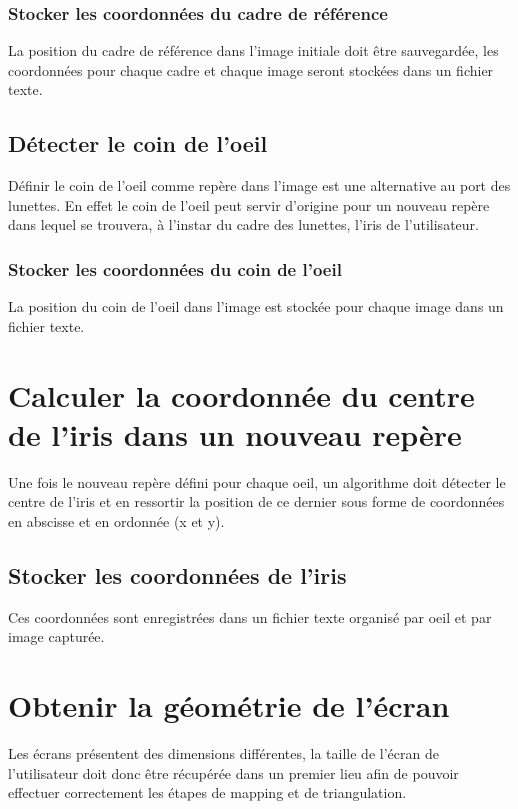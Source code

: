 \documentclass[a4paper, 12pt]{report}
\begin{document}
\subsubsection{Stocker les coordonnées du cadre de référence}
La position du cadre de référence dans l'image initiale doit être sauvegardée, les coordonnées pour chaque cadre et chaque image seront stockées dans un fichier texte.
		\subsection{Détecter le coin de l'oeil}
Définir le coin de l'oeil comme repère dans l'image est une alternative au port des lunettes. En effet le coin de l'oeil peut servir d'origine pour un nouveau repère dans lequel se trouvera, à l'instar du cadre des lunettes, l'iris de l'utilisateur.
\subsubsection{Stocker les coordonnées du coin de l'oeil}
La position du coin de l'oeil dans l'image est stockée pour chaque image dans un fichier texte. 

    \section{Calculer la coordonnée du centre de l'iris dans un nouveau repère}
    Une fois le nouveau repère défini pour chaque oeil, un algorithme doit détecter le centre de l'iris et en ressortir la position de ce dernier sous forme de coordonnées en abscisse et en ordonnée (x et y).
\subsection{Stocker les coordonnées de l'iris}
Ces coordonnées sont enregistrées dans un fichier texte organisé par oeil et par image capturée.
    	\section{Obtenir la géométrie de l'écran}
	Les écrans présentent des dimensions différentes, la taille de l'écran de l'utilisateur doit donc être récupérée dans un premier lieu afin de pouvoir effectuer correctement les étapes de mapping et de triangulation.
\end{document}
